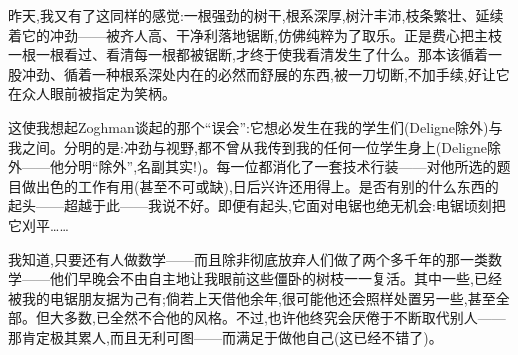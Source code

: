 昨天,我又有了这同样的感觉:一根强劲的树干,根系深厚,树汁丰沛,枝条繁壮、延续着它的冲劲——被齐人高、干净利落地锯断,仿佛纯粹为了取乐。正是费心把主枝一根一根看过、看清每一根都被锯断,才终于使我看清发生了什么。那本该循着一股冲劲、循着一种根系深处内在的必然而舒展的东西,被一刀切断,不加手续,好让它在众人眼前被指定为笑柄。

这使我想起Zoghman谈起的那个“误会”:它想必发生在我的学生们(Deligne除外)与我之间。分明的是:冲劲与视野,都不曾从我传到我的任何一位学生身上(Deligne除外——他分明“除外”,名副其实!)。每一位都消化了一套技术行装——对他所选的题目做出色的工作有用(甚至不可或缺),日后兴许还用得上。是否有别的什么东西的起头——超越于此——我说不好。即便有起头,它面对电锯也绝无机会:电锯顷刻把它刈平……

我知道,只要还有人做数学\dmark{}——而且除非彻底放弃人们做了两个多千年的那一类数学——他们早晚会不由自主地让我眼前这些僵卧的树枝一一复活。其中一些,已经被我的电锯朋友据为己有;倘若上天借他余年,很可能他还会照样处置另一些,甚至全部。但大多数,已全然不合他的风格。不过,也许他终究会厌倦于不断取代别人——那肯定极其累人,而且无利可图——而满足于做他自己(这已经不错了)。
